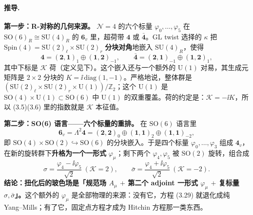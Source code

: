 \paragraph{推导.}

\textbf{第一步：R-对称的几何来源。} $\mathcal N=4$ 的六个标量 $\varphi_0,\dots,\varphi_5$ 在 $\mathrm{SO}(6)_R\cong\mathrm{SU}(4)_R$ 的 $\mathbf 6_v$ 里，超荷带 $\mathbf 4$ 或 $\bar{\mathbf 4}$。GL twist 选择的 $\kappa$ 把 $\mathrm{Spin}(4)=\mathrm{SU}(2)_\ell\times\mathrm{SU}(2)_r$ \textbf{分块对角}地嵌入 $\mathrm{SU}(4)_R$，使得\pA{}
\begin{equation}
\mathbf 4=(\mathbf 2,\mathbf 1)_{1}\oplus(\mathbf 1,\mathbf 2)_{-1},
\qquad
\bar{\mathbf 4}=(\mathbf 2,\mathbf 1)_{-1}\oplus(\mathbf 1,\mathbf 2)_{1},
\label{eq:fourbar}
\end{equation}
其中下标是 $\mathcal K$ 荷（定义见下）。这个嵌入还与一个额外的 $\mathrm U(1)$ 对易，其生成元矩阵是 $2\times2$ 分块的 $K=\ii\,\mathrm{diag}(1,-1)$\pA{}。严格地说，整体群是 $(\mathrm{SU}(2)_\ell\times\mathrm{SU}(2)_r\times\mathrm U(1))/\mathbb Z_2$；这个 $\mathrm U(1)$ 是 $\mathrm{SO}(4)\times\mathrm U(1)\subset \mathrm{SO}(6)$ 中 $\mathrm U(1)$ 的双重覆盖\pA{}。荷的约定是：$\mathcal K=-\ii K$，所以 (3.5)(3.6) 里的指数就是 $\mathcal K$ 本征值。

\textbf{第二步：SO(6) 语言——六个标量的重排。} 在 $\mathrm{SO}(6)$ 语言里
\begin{equation}
\mathbf 6_v=\Lambda^2\mathbf 4=(\mathbf 2,\mathbf 2)_0\oplus(\mathbf 1,\mathbf 1)_{2}\oplus(\mathbf 1,\mathbf 1)_{-2},
\label{eq:sixv}
\end{equation}
即 $\mathrm{SO}(4)\times\mathrm{SO}(2)\hookrightarrow\mathrm{SO}(6)$ 的分块嵌入\pA{}。于是四个标量 $\varphi_0,\dots,\varphi_3$ 组成 $\mathbf 4_v$，在新的旋转群下\textbf{升格为一个一形式} $\varphi_\mu$；剩下两个 $\varphi_4,\varphi_5$ 被 $\mathrm{SO}(2)$ 旋转，组合成
\begin{equation}
\sigma=\frac{\varphi_4-\ii\varphi_5}{\sqrt2}\ (\mathcal K=2),
\qquad
\bar\sigma=\frac{\varphi_4+\ii\varphi_5}{\sqrt2}\ (\mathcal K=-2).
\label{eq:sigma}
\end{equation}
\textbf{结论：扭化后的玻色场是「规范场 $A_\mu$ $+$ 第二个 adjoint 一形式 $\varphi_\mu$ $+$ 复标量 $\sigma,\bar\sigma$」。}这个额外的 $\varphi_\mu$ 是全部物理的来源：没有它，方程 (3.29) 就退化成纯 Yang--Mills；有了它，固定点方程才成为 Hitchin 方程那一类东西\pB{}。

